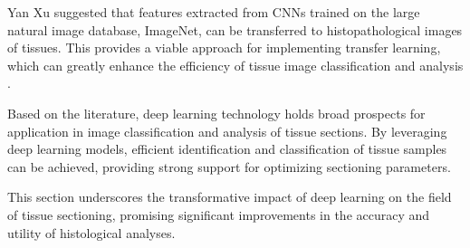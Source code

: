 Yan Xu suggested that features extracted from CNNs trained on the large natural image database, ImageNet, can be transferred to histopathological images of tissues. This provides a viable approach for implementing transfer learning, which can greatly enhance the efficiency of tissue image classification and analysis \cite{LR.9}.

Based on the literature, deep learning technology holds broad prospects for application in image classification and analysis of tissue sections. By leveraging deep learning models, efficient identification and classification of tissue samples can be achieved, providing strong support for optimizing sectioning parameters.

This section underscores the transformative impact of deep learning on the field of tissue sectioning, promising significant improvements in the accuracy and utility of histological analyses.












